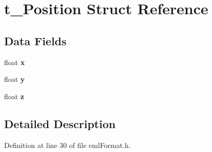 \hypertarget{structt___position}{}\section{t\+\_\+\+Position Struct Reference}
\label{structt___position}
\subsection*{Data Fields}
\begin{DoxyCompactItemize}
\item 
float {\bfseries x}\hypertarget{structt___position_af7e02d6c0ee63f68afa04f70a9d0eeee}{}\label{structt___position_af7e02d6c0ee63f68afa04f70a9d0eeee}

\item 
float {\bfseries y}\hypertarget{structt___position_a5b784932f0e6910fafe4c98fa69186ea}{}\label{structt___position_a5b784932f0e6910fafe4c98fa69186ea}

\item 
float {\bfseries z}\hypertarget{structt___position_aabd279db63be3d74143634fb8714aea0}{}\label{structt___position_aabd279db63be3d74143634fb8714aea0}

\end{DoxyCompactItemize}


\subsection{Detailed Description}


Definition at line 30 of file eml\+Format.\+h.

